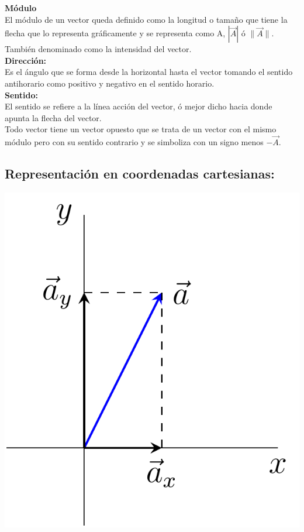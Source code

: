 \textbf{Módulo}\\

El módulo de un vector queda definido como la longitud o tamaño que tiene la flecha que lo representa gráficamente y se 
representa como A, $|\vec{A}|$ ó $\|\vec{A}\|$. También denominado como la intensidad del vector.\\

\textbf{Dirección:}\\

Es el ángulo que se forma desde la horizontal hasta el vector tomando el sentido antihorario como positivo y negativo 
en el sentido horario.\\

\textbf{Sentido:}\\

El sentido se refiere a la línea acción del vector, ó mejor dicho hacia donde apunta la flecha del vector.\\

Todo vector tiene un vector opuesto que se trata de un vector con el mismo módulo pero con su sentido contrario y se 
simboliza con un signo menos $-\vec{A}$.\\

\subsection{Representación en coordenadas cartesianas:}

\begin{center}
 \includegraphics[scale = 0.3]{images/Vector_in_2D_space.png}
\end{center}


